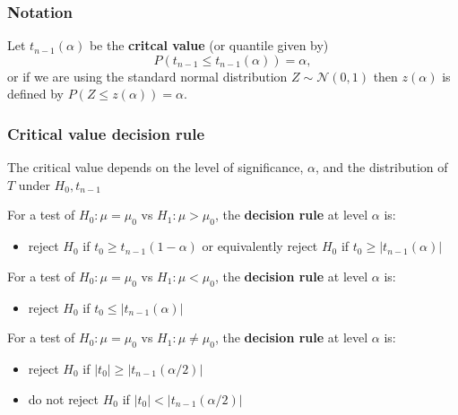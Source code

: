 \documentclass[a4paper]{article}\usepackage[]{graphicx}\usepackage[]{xcolor}
\begin{document}
\subsubsection{Notation}
Let \( t_{n-1} (\alpha) \) be the \textbf{critcal value} (or quantile given by)
\[
	P(t_{n-1} \le t_{n-1}(\alpha))=\alpha,
\]
or if we are using the standard normal distribution \(  Z \sim \mathcal{N} (0,1) \) then \( z(\alpha) \) is defined by \( P(Z \leq z(\alpha))=\alpha \).
\subsubsection{Critical value decision rule}
The critical value depends on the level of significance, \( \alpha \), and the distribution of \( T \) under \( H_0, t_{n-1} \)
\begin{greenbox}
	For a test of \( H_0: \mu = \mu_0 \) vs \( H_1: \mu > \mu_0 \), the \textbf{decision rule} at level \( \alpha \) is:
	\begin{itemize}
		\item reject \( H_0 \) if \( t_0 \geq t_{n-1} (1-\alpha) \) or equivalently reject \( H_0 \) if \( t_0 \geq \lvert t_{n-1} (\alpha) \rvert \) 
	\end{itemize}
	For a test of \( H_0: \mu = \mu_0 \) vs \( H_1: \mu < \mu_0 \), the \textbf{decision rule} at level \( \alpha \) is:
	\begin{itemize}
		\item reject \( H_0 \) if \( t_0 \leq \lvert t_{n-1} (\alpha) \rvert \) 
	\end{itemize}
	For a test of \( H_0: \mu = \mu_0 \) vs \( H_1: \mu \neq \mu_0 \), the \textbf{decision rule} at level \( \alpha \) is:
	\begin{itemize}
		\item reject \( H_0 \) if \( \lvert t_0 \rvert \geq \lvert t_{n-1} (\alpha / 2) \rvert \)
		\item do not reject \( H_0 \) if \( \lvert t_0 \rvert < \lvert t_{n-1} (\alpha / 2) \rvert \) 
	\end{itemize}
\end{greenbox}
\end{document}
